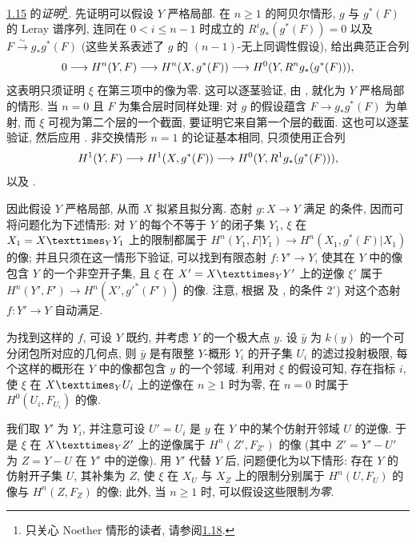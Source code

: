 \noindent
\hyperref[XV.thm1.15]{1.15} 的\emph{证明}\footnote[1]{只关心 Noether 情形的读者, 请参阅\hyperref[XV.rem1.18]{1.18}.}.
先证明可以假设 $Y$ 严格局部. 在 $n\geq 1$ 的阿贝尔情形, $g$ 与 $g^{\ast}(F)$ 的 Leray 谱序列, 连同在 $0<i\leq n-1$ 时成立的 $R^{i}g_{\ast}(g^{\ast}(F))=0$ 以及 $F\xrightarrow{\sim}g_{\ast}g^{\ast}(F)$ (这些关系表述了 $g$ 的 $(n-1)$-无上同调性假设), 给出典范正合列
$$
0\longrightarrow H^{n}(Y,F)\longrightarrow
H^{n}(X,g^{\ast}(F))\longrightarrow
H^{0}(Y,R^{n}g_{\ast}(g^{\ast}(F))){},
$$
这表明只须证明 $\xi$ 在第三项中的像为零. 这可以逐茎验证, 由 , 就化为 $Y$ 严格局部的情形. 当 $n=0$ 且 $F$ 为集合层时同样处理: 对 $g$ 的假设蕴含 $F\rightarrow g_{\ast}g^{\ast}(F)$ 为单射, 而 $\xi$ 可视为第二个层的一个截面, 要证明它来自第一个层的截面. 这也可以逐\pageoriginale 茎验证, 然后应用 . 非交换情形 $n=1$ 的论证基本相同, 只须使用正合列 
$$
H^{1}(Y,F)\longrightarrow H^{1}(X,g^{\ast}(F))\longrightarrow
H^{0}(Y,R^{1}g_{\ast}(g^{\ast}(F))){},
$$
以及 .

因此假设 $Y$ 严格局部, 从而 $X$ 拟紧且拟分离. 态射 $g:X\rightarrow Y$ 满足  的条件, 因而可将问题化为下述情形: 对 $Y$ 的每个不等于 $Y$ 的闭子集 $Y_1$, $\xi$ 在 $X_1=\fprod{X}{Y_1}{Y}$ 上的限制都属于 $H^{n}(Y_1,F|Y_1)\rightarrow H^{n}(X_1,g^{\ast}(F)|X_1)$ 的像; 并且只须在这一情形下验证, 可以找到有限态射 $f:Y'\rightarrow Y$, 使其在 $Y$ 中的像包含 $Y$ 的一个非空开子集, 且 $\xi$ 在 $X'=\fprod{X}{Y'}{Y}$ 上的逆像 $\xi'$ 属于 $H^{n}(Y',F')\rightarrow H^{n}(X',{g'}^{\ast}(F'))$ 的像. 注意, 根据  及 , \loccit 的条件 $2^{\circ}$) 对这个态射 $f:Y'\rightarrow Y$ 自动满足.

为找到这样的 $f$, 可设 $Y$ 既约, 并考虑 $Y$ 的一个极大点 $y$. 设 $\bar{y}$ 为 $k(y)$ 的一个可分闭包所对应的几何点, 则 $\bar{y}$ 是有限整 $Y$-概形 $Y_i$ 的开子集 $U_i$ 的滤过投射极限, 每个这样的概形在 $Y$ 中的像都包含 $y$ 的一个邻域. 利用对 $\xi$ 的假设可知, 存在指标 $i$, 使 $\xi$ 在 $\fprod{X}{U_i}{Y}$ 上的逆像在 $n\geq 1$ 时为零, \resp 在 $n=0$ 时属于 $H^{0}(U_i,F_{U_i})$ 的像.

我们\pageoriginale 取 $Y'$ 为 $Y_i$, 并注意可设 $U'=U_i$ 是 $y$ 在 $Y$ 中的某个仿射开邻域 $U$ 的逆像. 于是 $\xi$ 在 $\fprod{X}{Z'}{Y}$ 上的逆像属于 $H^{n}(Z',F_{Z'})$ 的像 (其中 $Z'=Y'-U'$ 为 $Z=Y-U$ 在 $Y'$ 中的逆像). 用 $Y'$ 代替 $Y$ 后, 问题便化为以下情形: 存在 $Y$ 的仿射开子集 $U$, 其补集为 $Z$, 使 $\xi$ 在 $X_U$ 与 $X_Z$ 上的限制分别属于 $H^{n}(U,F_U)$ 的像与 $H^{n}(Z,F_Z)$ 的像; 此外, 当 $n\geq 1$ 时, 可以假设这些限制\emph{为零}.

